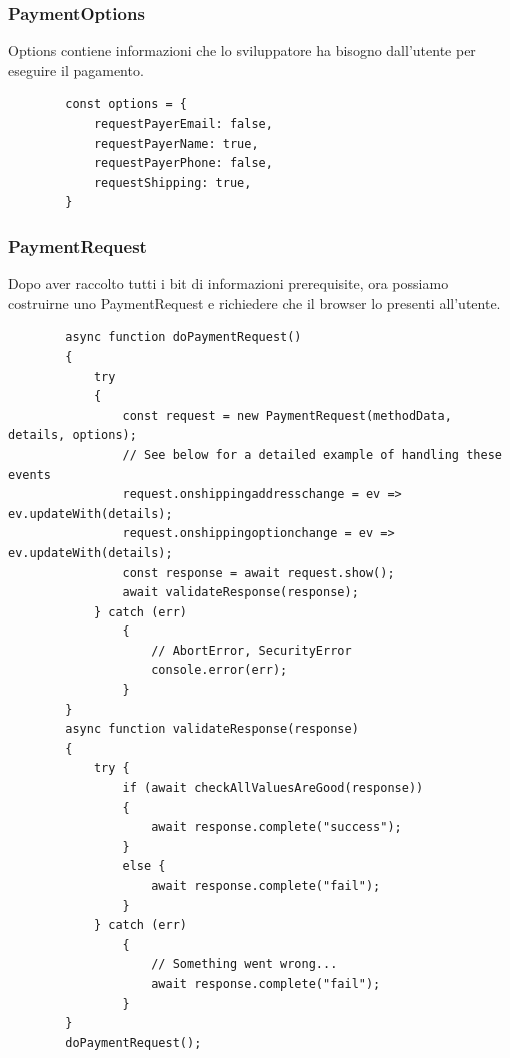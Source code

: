 \documentclass[11pt ,a4paper , twoside , openright ]{article}
\begin{document}
	\subsubsection{PaymentOptions}
	Options contiene informazioni che lo sviluppatore ha bisogno dall'utente per eseguire il pagamento.
	\begin{lstlisting}
		const options = {
			requestPayerEmail: false,
			requestPayerName: true,
			requestPayerPhone: false,
			requestShipping: true,
		}
	\end{lstlisting}
	
	
	\subsubsection{PaymentRequest}
	Dopo aver raccolto tutti i bit di informazioni prerequisite, ora possiamo costruirne uno PaymentRequest e richiedere che il browser lo presenti all'utente.
	\begin{lstlisting}
		async function doPaymentRequest() 
		{
			try 
			{
				const request = new PaymentRequest(methodData, details, options);
				// See below for a detailed example of handling these events
				request.onshippingaddresschange = ev => ev.updateWith(details);
				request.onshippingoptionchange = ev => ev.updateWith(details);
				const response = await request.show();
				await validateResponse(response);
			} catch (err) 
				{
					// AbortError, SecurityError
					console.error(err);
				}
		}
		async function validateResponse(response) 
		{
			try {
				if (await checkAllValuesAreGood(response)) 
				{
					await response.complete("success");
				} 
				else {
					await response.complete("fail");
				}
			} catch (err) 
				{
					// Something went wrong...
					await response.complete("fail");
				}
		}
		doPaymentRequest();
	\end{lstlisting}
	\newpage
\end{document}
